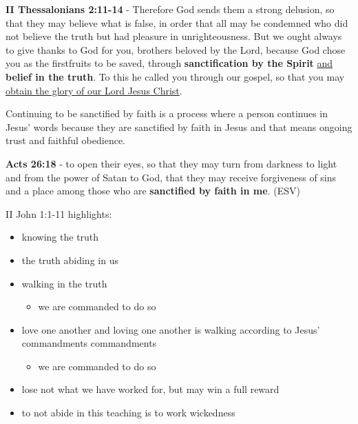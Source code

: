 \documentclass[11pt]{article}
\begin{document}
\textbf{II Thessalonians 2:11-14} - Therefore God sends them a strong delusion, so that they may believe what is false, in order that all may be condemned who did not believe the truth but had pleasure in unrighteousness. But we ought always to give thanks to God for you, brothers beloved by the Lord, because God chose you as the firstfruits to be saved, through \textbf{sanctification by the Spirit} \uline{and} \textbf{belief in the truth}. To this he called you through our gospel, so that you may \uline{obtain the glory of our Lord Jesus Christ}.

Continuing to be sanctified by faith is a process where a person continues in Jesus' words because they are sanctified by faith in Jesus and that means ongoing trust and faithful obedience.

\textbf{Acts 26:18} - to open their eyes, so that they may turn from darkness to light and from the power of Satan to God, that they may receive forgiveness of sins and a place among those who are \textbf{sanctified by faith in me}. (ESV)

II John 1:1-11 highlights:
\begin{itemize}
\item knowing the truth
\item the truth abiding in us
\item walking in the truth
\begin{itemize}
\item we are commanded to do so
\end{itemize}
\item love one another and loving one another is walking according to Jesus' commandments commandments
\begin{itemize}
\item we are commanded to do so
\end{itemize}
\item lose not what we have worked for, but may win a full reward
\item to not abide in this teaching is to work wickedness
\end{itemize}
\end{document}
